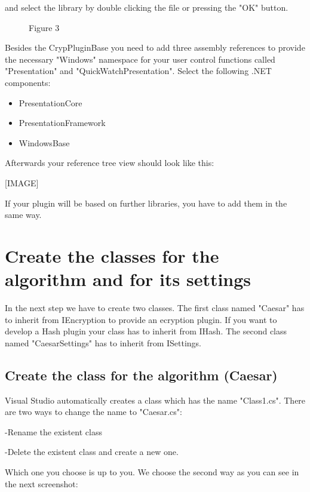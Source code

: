and select the library by double clicking the file or pressing the "OK" button.

\begin{figure}
    \caption{Figure 3}\label{fig:figure3}
\end{figure}

Besides the CrypPluginBase you need to add three assembly references to provide the necessary "Windows" namespace for your user control functions called "Presentation" and "QuickWatchPresentation". Select the following .NET components:

\begin{itemize}
    \item PresentationCore
    \item PresentationFramework
    \item WindowsBase
\end{itemize}

Afterwards your reference tree view should look like this:

[IMAGE]

If your plugin will be based on further libraries, you have to add them in the same way.


\section{Create the classes for the algorithm and for its settings}\label{sec:CreateTheClassesForTheAlgorithmAndForItsSettings}
In the next step we have to create two classes. The first class named "Caesar" has to inherit from IEncryption to provide an ecryption plugin. If you want to develop a Hash plugin your class has to inherit from IHash.
The second class named "CaesarSettings" has to inherit from ISettings.
\subsection{Create the class for the algorithm (Caesar)}\label{sec:CreateTheClassForTheAlgorithmCaesar}
Visual Studio automatically creates a class which has the name "Class1.cs".  There are two ways to change the name to "Caesar.cs":

\hspace{20pt}-Rename the existent class

\hspace{20pt}-Delete the existent class and create a new one.

Which one you choose is up to you. We choose the second way as you can see in the next screenshot:

